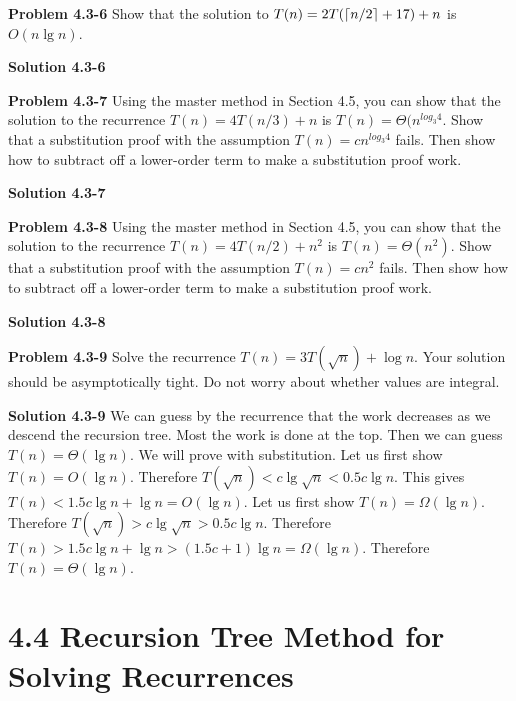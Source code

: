 \documentclass{article}
\DeclarePairedDelimiter\ceil{\lceil}{\rceil}
\begin{document}
\medskip

\textbf{Problem 4.3-6} Show that the solution to $T(n) = 2T(\ceil{n/2} + 17) + n$ is $O(n \lg n)$.

\medskip

\textbf{Solution 4.3-6}

\hrulefill

\medskip

\textbf{Problem 4.3-7} Using the master method in Section 4.5, you can show that the solution to the recurrence $T(n) = 4T(n/3) + n$ is $T(n) = \Theta(n^{log_3 4}$. Show that a substitution proof with the assumption $T(n) = cn^{log_3 4}$ fails. Then show how to subtract off a lower-order term to make a substitution proof work.

\medskip

\textbf{Solution 4.3-7}

\hrulefill

\medskip

\textbf{Problem 4.3-8} Using the master method in Section 4.5, you can show that the solution to the recurrence $T(n) = 4T(n/2) + n^2$ is $T(n) = \Theta(n^2)$. Show that a substitution proof with the assumption $T(n)   = cn^2$ fails. Then show how to subtract off a lower-order term to make a substitution proof work.

\medskip

\textbf{Solution 4.3-8}

\hrulefill

\medskip

\textbf{Problem 4.3-9} Solve the recurrence $T(n) = 3T(\sqrt{n}) + \log n$. Your solution should be asymptotically tight. Do not worry about whether values are integral.

\medskip

\textbf{Solution 4.3-9} We can guess by the recurrence that the work decreases as we descend the recursion tree. Most the work is done at the top. Then we can guess $T(n) = \Theta(\lg n)$. We will prove with substitution. Let us first show $T(n) = O(\lg n)$. Therefore $T(\sqrt{n}) < c\lg \sqrt{n} < 0.5c \lg n$. This gives $T(n) < 1.5c \lg n + \lg n = O(\lg n)$. Let us first show $T(n) = \Omega(\lg n)$. Therefore $T(\sqrt{n}) > c \lg \sqrt{n} > 0.5c\lg n$. Therefore $T(n) > 1.5c\lg n + \lg n > (1.5c + 1) \lg n = \Omega(\lg n)$. Therefore $T(n) = \Theta(\lg n)$.

\hrulefill

\section*{4.4 Recursion Tree Method for Solving Recurrences}
\end{document}
